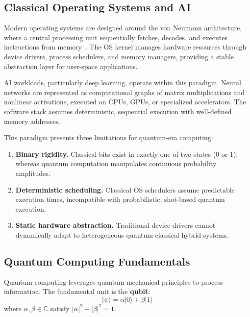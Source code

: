 ﻿\documentclass[12pt,a4paper]{article}
\begin{document}
\subsection{Classical Operating Systems and AI}

Modern operating systems are designed around the von Neumann architecture, where a central processing unit sequentially fetches, decodes, and executes instructions from memory~\cite{tanenbaum2023}. The OS kernel manages hardware resources through device drivers, process schedulers, and memory managers, providing a stable abstraction layer for user-space applications.

AI workloads, particularly deep learning, operate within this paradigm. Neural networks are represented as computational graphs of matrix multiplications and nonlinear activations, executed on CPUs, GPUs, or specialized accelerators. The software stack assumes deterministic, sequential execution with well-defined memory addresses.

This paradigm presents three limitations for quantum-era computing:

\begin{enumerate}[leftmargin=2em]
    \item \textbf{Binary rigidity.} Classical bits exist in exactly one of two states (0 or 1), whereas quantum computation manipulates continuous probability amplitudes.
    \item \textbf{Deterministic scheduling.} Classical OS schedulers assume predictable execution times, incompatible with probabilistic, shot-based quantum execution.
    \item \textbf{Static hardware abstraction.} Traditional device drivers cannot dynamically adapt to heterogeneous quantum-classical hybrid systems.
\end{enumerate}

\subsection{Quantum Computing Fundamentals}

Quantum computing leverages quantum mechanical principles to process information. The fundamental unit is the \textbf{qubit}:
\begin{equation}
    |\psi\rangle = \alpha|0\rangle + \beta|1\rangle
\end{equation}
where $\alpha, \beta \in \mathbb{C}$ satisfy $|\alpha|^2 + |\beta|^2 = 1$.
\end{document}
